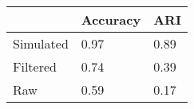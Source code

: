 \begin{tabular}{lll}
\toprule
{} & Accuracy &   ARI \\
\midrule
Simulated &     0.97 &  0.89 \\
Filtered  &     0.74 &  0.39 \\
Raw       &     0.59 &  0.17 \\
\bottomrule
\end{tabular}
